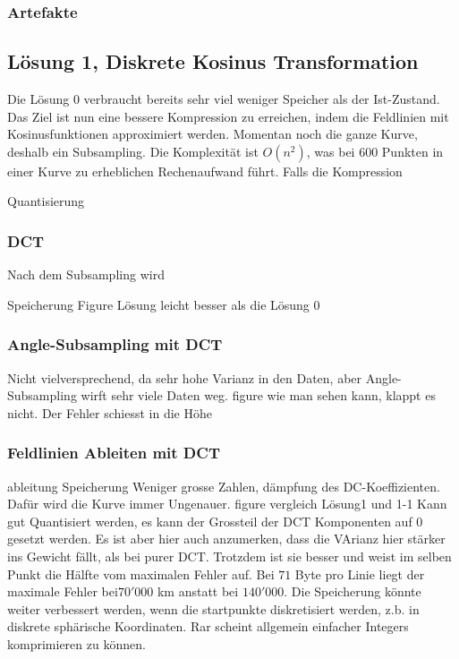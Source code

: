 \subsubsection{Artefakte}

\subsection{Lösung 1, Diskrete Kosinus Transformation}
Die Lösung 0 verbraucht bereits sehr viel weniger Speicher als der Ist-Zustand. Das Ziel ist nun eine bessere Kompression zu erreichen, indem die Feldlinien mit Kosinusfunktionen approximiert werden.
Momentan noch die ganze Kurve, deshalb ein Subsampling. Die Komplexität ist $O(n^2)$, was bei $600$ Punkten in einer Kurve zu erheblichen Rechenaufwand führt. Falls die Kompression 

Quantisierung

\subsubsection{DCT}
Nach dem Subsampling wird


Speicherung
Figure
Lösung leicht besser als die Lösung 0



\subsubsection{Angle-Subsampling mit DCT}
Nicht vielversprechend, da sehr hohe Varianz in den Daten, aber Angle-Subsampling wirft sehr viele Daten weg.
figure 
wie man sehen kann, klappt es nicht. Der Fehler schiesst in die Höhe

\subsubsection{Feldlinien Ableiten mit DCT}\label{resultate:dct:ableitung_dct}
ableitung
Speicherung
Weniger grosse Zahlen, dämpfung des DC-Koeffizienten. Dafür wird die Kurve immer Ungenauer.
figure vergleich Lösung1 und 1-1
Kann gut Quantisiert werden, es kann der Grossteil der DCT Komponenten auf 0 gesetzt werden. Es ist aber hier auch anzumerken, dass die VArianz hier stärker ins  Gewicht fällt, als bei purer DCT. Trotzdem ist sie besser und weist im selben Punkt die Hälfte vom maximalen Fehler auf. Bei $71$ Byte pro Linie liegt der maximale Fehler bei$70'000$ km anstatt bei $140'000$.
Die Speicherung könnte weiter verbessert werden, wenn die startpunkte diskretisiert werden, z.b. in diskrete sphärische Koordinaten. Rar scheint allgemein einfacher Integers komprimieren zu können.



